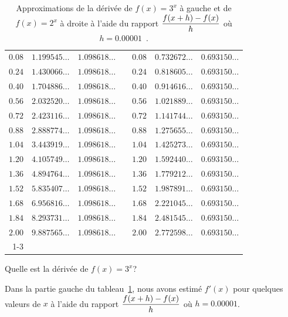 {\begin{table}[t]
{\begin{center}
\begin{tabular}{r|c|ccr|c|c}
$0.08$ & $1.199545\ldots$ & $1.098618\ldots$ && $0.08$ & $0.732672\ldots$ & $0.693150\ldots$ \\
$0.24$ & $1.430066\ldots$ & $1.098618\ldots$ && $0.24$ & $0.818605\ldots$ & $0.693150\ldots$ \\
$0.40$ & $1.704886\ldots$ & $1.098618\ldots$ && $0.40$ & $0.914616\ldots$ & $0.693150\ldots$ \\
$0.56$ & $2.032520\ldots$ & $1.098618\ldots$ && $0.56$ & $1.021889\ldots$ & $0.693150\ldots$ \\
$0.72$ & $2.423116\ldots$ & $1.098618\ldots$ && $0.72$ & $1.141744\ldots$ & $0.693150\ldots$ \\
$0.88$ & $2.888774\ldots$ & $1.098618\ldots$ && $0.88$ & $1.275655\ldots$ & $0.693150\ldots$ \\
$1.04$ & $3.443919\ldots$ & $1.098618\ldots$ && $1.04$ & $1.425273\ldots$ & $0.693150\ldots$ \\
$1.20$ & $4.105749\ldots$ & $1.098618\ldots$ && $1.20$ & $1.592440\ldots$ & $0.693150\ldots$ \\
$1.36$ & $4.894764\ldots$ & $1.098618\ldots$ && $1.36$ & $1.779212\ldots$ & $0.693150\ldots$ \\
$1.52$ & $5.835407\ldots$ & $1.098618\ldots$ && $1.52$ & $1.987891\ldots$ & $0.693150\ldots$ \\
$1.68$ & $6.956816\ldots$ & $1.098618\ldots$ && $1.68$ & $2.221045\ldots$ & $0.693150\ldots$ \\
$1.84$ & $8.293731\ldots$ & $1.098618\ldots$ && $1.84$ & $2.481545\ldots$ & $0.693150\ldots$ \\
$2.00$ & $9.887565\ldots$ & $1.098618\ldots$ && $2.00$ & $2.772598\ldots$ & $0.693150\ldots$ \\
\cline{1-3} \cline{5-7}
\end{tabular}
\end{center}
}
\caption[Approximations de la dérivée de $f(x) = 3^x$ et de $f(x) =2^x$ à
partir de la définition de la dérivées.]{Approximations de la dérivée
de $f(x) = 3^x$ à gauche et de $f(x) = 2^x$ à droite à l'aide du rapport
$\displaystyle \frac{f(x+h)-f(x)}{h}$ où $h = 0.00001$\ .\label{TAB_32_EXP}}
\end{table}

\begin{egg}
Quelle est la dérivée de $f(x) = 3^x$?

Dans la partie gauche du tableau~\ref{TAB_32_EXP}, nous avons
estimé $f'(x)$ pour quelques valeurs de $x$ à l'aide du rapport
$\displaystyle \frac{f(x+h)-f(x)}{h}$ où $h = 0.00001$.


\end{egg}}
